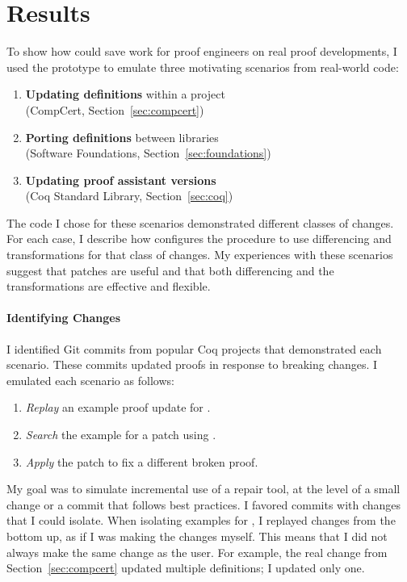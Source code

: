\section{Results}
\label{sec:pumpkin-results}



To show how \sysname could save work for proof engineers
on real proof developments, I used the \sysname prototype to emulate three motivating scenarios from real-world code:

\begin{enumerate}
\item \textbf{Updating definitions} within a project \\
(CompCert, Section~\ref{sec:compcert})
\item \textbf{Porting definitions} between libraries \\
(Software Foundations, Section~\ref{sec:foundations})
\item \textbf{Updating proof assistant versions} \\
(Coq Standard Library, Section~\ref{sec:coq})
\end{enumerate}
The code I chose for these scenarios demonstrated different classes of changes.
For each case, I describe how \sysname configures the procedure to use differencing and transformations for that class of changes.
My experiences with these scenarios suggest that patches are useful and that both differencing and the transformations 
are effective and flexible.

\paragraph{Identifying Changes} I identified Git commits from popular Coq projects that
demonstrated each scenario.
These commits updated proofs in response to breaking changes.
I emulated each scenario as follows:

\begin{enumerate}
\item \textit{Replay} an example proof update for \sysname.
\item \textit{Search} the example for a patch using \sysname.
\item \textit{Apply} the patch to fix a different broken proof.
\end{enumerate}
My goal was to simulate incremental use of a repair tool,
at the level of a small change or a commit that follows best practices.
I favored commits with changes that I could isolate.
When isolating examples for \sysname, I replayed changes from the bottom up,
as if I was making the changes myself.
This means that I did not always make the same change as the user. For example,
the real change from Section~\ref{sec:compcert} updated multiple definitions;
I updated only one.

